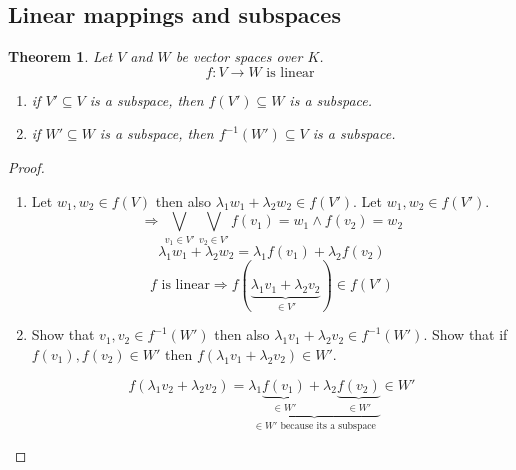 \documentclass[a4paper,landscape,twocolumn]{article}
\newtheorem{theorem}{Theorem}
\begin{document}
\subsection{Linear mappings and subspaces}
\begin{theorem}
  \label{satz-5-11}
  Let $V$ and $W$ be vector spaces over $K$.
  \[ f: V \rightarrow W \text{ is linear} \]
  \begin{enumerate}
    \item if $V' \subseteq V$ is a subspace, then $f(V') \subseteq W$ is a subspace.
    \item if $W' \subseteq W$ is a subspace, then $f^{-1}(W') \subseteq V$ is a subspace.
  \end{enumerate}
\end{theorem}
\begin{proof}
  \begin{enumerate}
    \item
      Let $w_1, w_2 \in f(V)$ then also $\lambda_1 w_1 + \lambda_2 w_2 \in f(V')$.
      Let $w_1, w_2 \in f(V')$.
      \[
        \Rightarrow \bigvee_{v_1 \in V'} \bigvee_{v_2 \in V'}
        f(v_1) = w_1 \land f(v_2) = w_2
      \]
      \[ \lambda_1 w_1 + \lambda_2 w_2 = \lambda_1 f(v_1) + \lambda_2 f(v_2) \]
      \[ f \text{ is linear} \Rightarrow f(\underbrace{\lambda_1 v_1 + \lambda_2 v_2}_{\in V'}) \in f(V') \]
    \item Show that $v_1, v_2 \in f^{-1}(W')$ then also $\lambda_1 v_1 + \lambda_2 v_2 \in f^{-1}(W')$.
      Show that if $f(v_1), f(v_2) \in W'$ then $f(\lambda_1 v_1 + \lambda_2 v_2) \in W'$.

      \[
        f(\lambda_1 v_2 + \lambda_2 v_2)
        = \underbrace{\lambda_1 \underbrace{f(v_1)}_{\in W'} + \lambda_2 \underbrace{f(v_2)}_{\in W'}}_{\in W' \text{ because its a subspace}} \in W'
      \]
  \end{enumerate}
\end{proof}
\end{document}
